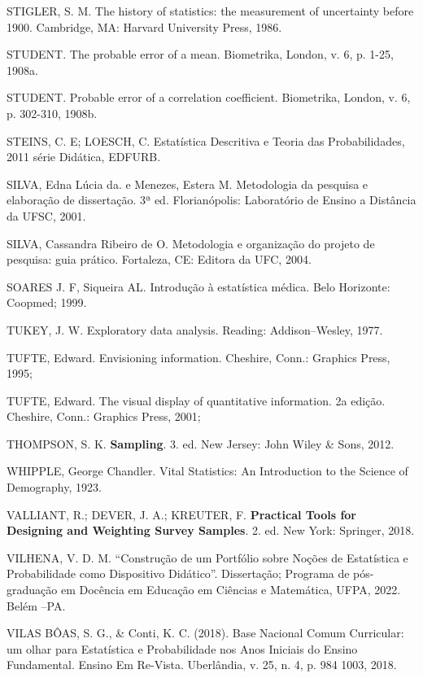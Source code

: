 STIGLER, S. M. The history of statistics: the measurement of uncertainty before 1900. Cambridge, MA: Harvard University Press, 1986. \vskip0.3cm

STUDENT. The probable error of a mean. Biometrika, London, v. 6, p. 1-25, 1908a.\vskip0.3cm

STUDENT. Probable error of a correlation coefficient. Biometrika, London, v. 6, p. 302-310, 1908b.\vskip0.3cm

STEINS, C. E; LOESCH, C. Estatística Descritiva e Teoria das Probabilidades, 2011 série Didática, EDFURB.\vskip0.3cm

SILVA, Edna Lúcia da. e Menezes, Estera M. Metodologia da pesquisa e elaboração de dissertação. 3ª ed. Florianópolis: Laboratório de Ensino a Distância da UFSC, 2001.\vskip0.3cm

SILVA, Cassandra Ribeiro de O. Metodologia e organização do projeto de pesquisa: guia prático. Fortaleza, CE: Editora da UFC, 2004.\vskip0.3cm

SOARES J. F, Siqueira AL. Introdução à estatística médica. Belo Horizonte: Coopmed; 1999. \vskip0.3cm

TUKEY, J. W. Exploratory data analysis. Reading: Addison–Wesley, 1977.\vskip0.3cm

TUFTE, Edward. Envisioning information. Cheshire, Conn.: Graphics Press, 1995;\vskip0.3cm

TUFTE, Edward. The visual display of quantitative information. 2a edição. Cheshire, Conn.: Graphics Press, 2001; \vskip0.3cm

THOMPSON, S. K. \textbf{Sampling}. 3. ed. New Jersey: John Wiley \& Sons, 2012. \vskip0.3cm

WHIPPLE, George Chandler. Vital Statistics: An Introduction to the Science of Demography, 1923. \vskip0.3cm

\newpage
VALLIANT, R.; DEVER, J. A.; KREUTER, F. \textbf{Practical Tools for Designing and Weighting Survey Samples}. 2. ed. New York: Springer, 2018. \vskip0.3cm

VILHENA, V. D. M. “Construção de um Portfólio sobre Noções de Estatística e Probabilidade como Dispositivo Didático”. Dissertação; Programa de pós-graduação em Docência em Educação em Ciências e Matemática, UFPA, 2022. Belém –PA.\vskip0.3cm

VILAS BÔAS, S. G., \& Conti, K. C. (2018). Base Nacional Comum Curricular: um olhar para Estatística e Probabilidade nos Anos Iniciais do Ensino Fundamental. Ensino Em Re-Vista. Uberlândia, v. 25, n. 4, p. 984 1003, 2018. \vskip0.3cm

